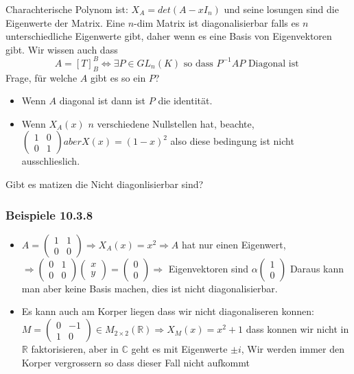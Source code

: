 \documentclass{article}
\newcommand{\beispiel}[1]{\subsubsection*{Beispiele {#1}}}
\begin{document}
Charachterische Polynom ist: $X_A=det(A-xI_n)$ und seine losungen sind die Eigenwerte der Matrix.
Eine $n$-dim Matrix ist diagonalisierbar falls es $n$ unterschiedliche Eigenwerte gibt, daher wenn es eine Basis von Eigenvektoren gibt. Wir wissen auch dass
\[A=[T]^B_B\Leftrightarrow\exists P\in GL_n(K) \text{ so dass } P^{-1}AP \text{ Diagonal ist }\]
Frage, für welche $A$ gibt es so ein $P$?\begin{itemize}
  \item{Wenn $A$ diagonal ist dann ist $P$ die identität.}
  \item{Wenn $X_A(x)$ $n$ verschiedene Nullstellen hat, beachte, $\begin{pmatrix}1&0\\0&1\end{pmatrix} aber X(x)=(1-x)^2$ also diese bedingung ist nicht ausschlieslich.}
\end{itemize}
Gibt es matizen die Nicht diagonlisierbar sind?
\beispiel{10.3.8} \begin{itemize}
  \item{$A=\begin{pmatrix}1&1\\0&0\end{pmatrix}\Rightarrow X_A(x)=x^2\Rightarrow A$ hat nur einen Eigenwert, $\Rightarrow\begin{pmatrix}0&1\\0&0\end{pmatrix}\begin{pmatrix}x\\y\end{pmatrix}=\begin{pmatrix}0\\0\end{pmatrix}\Rightarrow$ Eigenvektoren sind $\alpha \begin{pmatrix}1\\0\end{pmatrix}$ Daraus kann man aber keine Basis machen, dies ist nicht diagonalisierbar.}
  \item{Es kann auch am Korper liegen dass wir nicht diagonaliseren konnen: $M=\begin{pmatrix}0&-1\\1&0\end{pmatrix}\in M_{2\times2}(\mathbb{R})\Rightarrow X_M(x)=x^2+1$ dass konnen wir nicht in $\mathbb{R}$ faktorisieren, aber in $\mathbb{C}$ geht es mit Eigenwerte $\pm i$, Wir werden immer den Korper vergrossern so dass dieser Fall nicht aufkommt}    
  \end{itemize}
\end{document}
